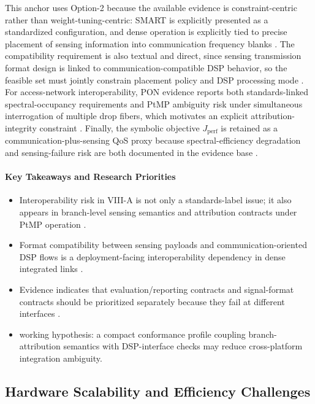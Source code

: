 \documentclass[lettersize,journal]{IEEEtran}
\begin{document}
This anchor uses Option-2 because the available evidence is constraint-centric rather than weight-tuning-centric: SMART is explicitly presented as a standardized configuration, and dense operation is explicitly tied to precise placement of sensing information into communication frequency blanks \cite{O_ISAC_220}. The compatibility requirement is also textual and direct, since sensing transmission format design is linked to communication-compatible DSP behavior, so the feasible set must jointly constrain placement policy and DSP processing mode \cite{O_ISAC_220}. For access-network interoperability, PON evidence reports both standards-linked spectral-occupancy requirements and PtMP ambiguity risk under simultaneous interrogation of multiple drop fibers, which motivates an explicit attribution-integrity constraint \cite{O_ISAC_104}. Finally, the symbolic objective $J_{\mathrm{perf}}$ is retained as a communication-plus-sensing QoS proxy because spectral-efficiency degradation and sensing-failure risk are both documented in the evidence base \cite{O_ISAC_220, O_ISAC_104}.

\paragraph{Key Takeaways and Research Priorities}
\begin{itemize}
    \item Interoperability risk in VIII-A is not only a standards-label issue; it also appears in branch-level sensing semantics and attribution contracts under PtMP operation \cite{O_ISAC_104}.
    \item Format compatibility between sensing payloads and communication-oriented DSP flows is a deployment-facing interoperability dependency in dense integrated links \cite{O_ISAC_220}.
    \item Evidence indicates that evaluation/reporting contracts and signal-format contracts should be prioritized separately because they fail at different interfaces \cite{O_ISAC_104, O_ISAC_220}.
    \item working hypothesis: a compact conformance profile coupling branch-attribution semantics with DSP-interface checks may reduce cross-platform integration ambiguity.
\end{itemize}

\subsection{Hardware Scalability and Efficiency Challenges}
\end{document}
